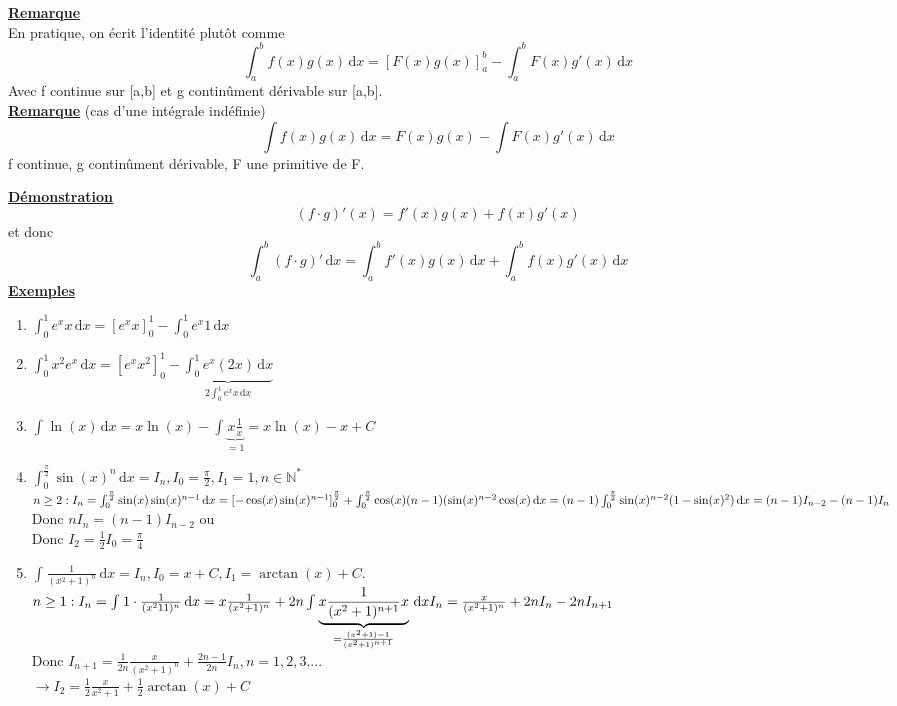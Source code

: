 \documentclass[12pt,a4paper]{article}
\newcommand{\evid}[1]{\textbf{\underline{#1}}}
\newcommand{\N}{\ensuremath{\mathbb{N}} }
\newcommand{\intx}[3]{\ensuremath{\int_{#1}^{#2} #3 \, \mathrm dx}}
\begin{document}
{\begin{boite}
\evid{Remarque}\\
En pratique, on écrit l'identité plutôt comme \\
\begin{equation}
	\intx{a}{b}{f(x)g(x)} = [F(x)g(x)]_a^b - \intx{a}{b}{F(x)g'(x)}
\end{equation}
Avec f continue sur [a,b] et g continûment dérivable sur [a,b].\\
\evid{Remarque} (cas d'une intégrale indéfinie)\\
\begin{equation}
	\int f(x)g(x) \, \mathrm dx = F(x)g(x) - \int F(x) g'(x) \, \mathrm dx
\end{equation}
f continue, g continûment dérivable, F une primitive de F.
\end{boite}
\evid{Démonstration}\\
\begin{equation}
(f\cdot g)'(x) = f'(x)g(x) + f(x)g'(x)
\end{equation}
et donc 
\begin{equation}
	\intx{a}{b}{(f\cdot g)'} = \intx{a}{b}{f'(x)g(x)} + \intx{a}{b}{f(x)g'(x)}
\end{equation}
\evid{Exemples}
\begin{enumerate}
	\item $\intx{0}{1}{e^xx} = [e^xx]_0^1-\intx{0}{1}{e^x1}$
	\item $\intx{0}{1}{x^2e^x} = [e^xx^2]_0^1 - \underbrace{\intx{0}{1}{e^x(2x)}}_{2\intx{0}{1}{e^xx}}$
	\item $\intx{}{}{\ln(x)} = x\ln(x) - \int{}{}{\underbrace{x\frac{1}{x}}_{=1}} = x\ln(x) - x + C$ 
	\item $\intx{0}{\frac{\pi}{2}}{\sin(x)^n} = I_n, I_0 = \frac{\pi}{2}, I_1 = 1, n \in \N^*$\\
	$n\geq 2 : I_n = \intx{0}{\frac{\pi}{2}}{\sin(x)\sin(x)^{n-1}}\\ 
	= [-\cos(x)\sin(x)^{n-1}]_0^{\frac{\pi}{2}} + \intx{0}{\frac{\pi}{2}}{\cos(x)(n-1)(\sin(x)^{n-2}\cos(x)} \\
	= (n-1)\intx{0}{\frac{\pi}{2}}{\sin(x)^{n-2}(1-\sin(x)^2)} \\
	= (n-1)I_{n-2} - (n-1)I_n$\\
	Donc $nI_n = (n-1)I_{n-2}$ ou \\
	Donc $I_2 = \frac{1}{2}I_0 = \frac{\pi}{4}$
	\item $\intx{}{}{\frac{1}{(x^2+1)^n}} = I_n, I_0 = x+C, I_1 = \arctan(x) + C$.\\
	$n\geq 1 : I_n = \intx{}{}{1\cdot\frac{1}{(x^211)^n}}\\
	= x\frac{1}{(x^2+1)^n} + 2n \intx{}{}{\underbrace{x \frac{1}{(x^2+1)^{n+1}} x}_{= \frac{(x^2+1)-1}{(x^2+1)^{n+1}}}}\\
	I_n = \frac{x}{(x^2+1)^n} + 2n I_n - 2nI_{n+1}$\\
	Donc $I_{n+1} = \frac{1}{2n} \frac{x}{(x^2+1)^n}+\frac{2n-1}{2n} I_n, n = 1,2,3....$\\
	$\to I_2 = \frac{1}{2} \frac{x}{x^2+1} + \frac{1}{2}\arctan(x) + C$
	\end{enumerate}
}
\end{document}
